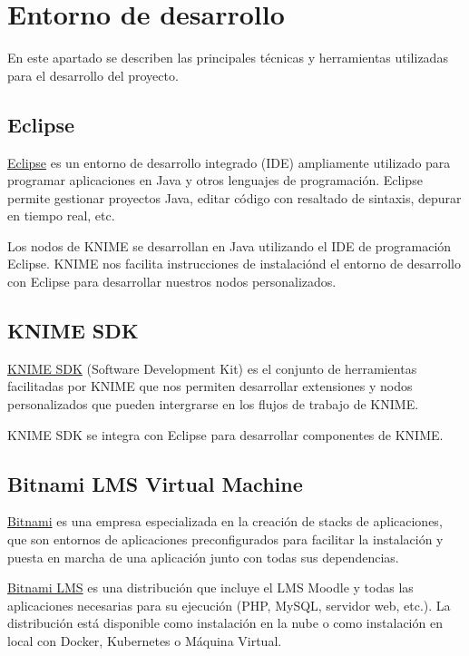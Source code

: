 

\section{Entorno de desarrollo}

En este apartado se describen las principales técnicas y herramientas utilizadas para el desarrollo del proyecto. 


\subsection{Eclipse}

\href{https://www.eclipse.org/ide/}{Eclipse} es un entorno de desarrollo integrado (IDE) ampliamente utilizado para programar aplicaciones en Java y 
otros lenguajes de programación. Eclipse permite gestionar proyectos Java, editar código con resaltado de sintaxis,
 depurar en tiempo real, etc. 
\

Los nodos de KNIME se desarrollan en Java utilizando el IDE de programación Eclipse. KNIME nos facilita instrucciones de 
instalaciónd el entorno de desarrollo con Eclipse para desarrollar nuestros nodos personalizados. 


\subsection{KNIME SDK}


\href{https://github.com/knime/knime-sdk-setup}{KNIME SDK} (Software Development Kit) es el conjunto de herramientas facilitadas por KNIME que nos permiten desarrollar 
extensiones y nodos personalizados que pueden intergrarse en los flujos de trabajo de KNIME.
\

KNIME SDK se integra con Eclipse para desarrollar componentes de KNIME. 


\subsection{Bitnami LMS Virtual Machine}

\href{https://bitnami.com/}{Bitnami} es una empresa especializada en la creación de stacks de aplicaciones, 
que son entornos de aplicaciones preconfigurados para facilitar la instalación y puesta en marcha de una aplicación junto 
con todas sus dependencias. 
\

\href{https://bitnami.com/stack/moodle}{Bitnami LMS} es una distribución que incluye el LMS Moodle y todas las aplicaciones 
necesarias para su ejecución (PHP, MySQL, servidor web, etc.). La distribución está disponible como instalación en la nube 
o como instalación en local con Docker, Kubernetes o Máquina Virtual. 
\


